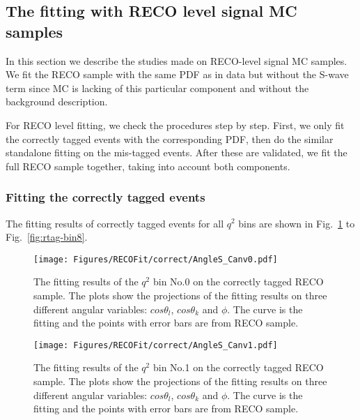 \clearpage

\subsection{The fitting with RECO level signal MC samples}
\label{sec:fitval-reco}

In this section we describe the studies made on RECO-level signal MC
samples. We fit the RECO sample with the same PDF as in data but without
the S-wave term since MC is lacking of this particular component and without
the background description.

For RECO level fitting, we check the procedures step by step. First,
we only fit the correctly tagged events with the corresponding PDF,
then do the similar standalone fitting on the mis-tagged events. After
these are validated, we fit the full RECO sample together, taking into
account both components.


\subsubsection{Fitting the correctly tagged events}
\label{sec:fitval-reco-rtag}

The fitting results of correctly tagged events for all $q^2$ bins are
shown in Fig.~\ref{fig:rtag-bin0} to Fig.~\ref{fig:rtag-bin8}.

\begin{figure}[!hbt]
  \centering
  \texttt{[image: Figures/RECOFit/correct/AngleS\_Canv0.pdf]}
  \caption{The fitting results of the $q^2$ bin No.0 on the correctly
    tagged RECO  sample. The plots show the projections of the fitting results on
    three different angular variables: $cos\theta_l$, $cos\theta_k$
    and $\phi$. The curve is the fitting and the points with error
    bars are from RECO sample. } 
  \label{fig:rtag-bin0}
\end{figure}


\begin{figure}[!hbt]
  \centering
  \texttt{[image: Figures/RECOFit/correct/AngleS\_Canv1.pdf]}
  \caption{The fitting results of the $q^2$ bin No.1 on the correctly
    tagged RECO  sample. The plots show the projections of the fitting results on
    three different angular variables: $cos\theta_l$, $cos\theta_k$
    and $\phi$. The curve is the fitting and the points with error
    bars are from RECO sample. } 
  \label{fig:rtag-bin1}
\end{figure}


